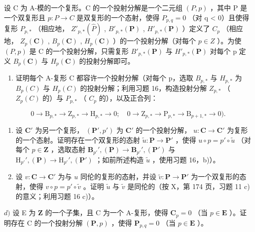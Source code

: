 设 C 为 A-模的一个复形。C 的一个投射分解是一个二元组 \((P, p)\) ，其中 P 是一个双复形且 \(p : P \to C\) 是双复形的一个态射，使得 \(P_{p,q} = 0\) （对 q \textless{} 0）且使得复形 \(P_{p,*}\) （相应地， \(Z'_{p,*}(\hat{P})\) , \(B'_{p,*}(\mathbf{P})\) , \(H'_{p,*}(\mathbf{P})\) ）定义了 \(C_p\) （相应地， \(Z_p(\mathbf{C})\) , \(B_p(\mathbf{C})\) , \(H_p(\mathbf{C})\) ）的一个投射分解（对每个 \(p \in Z\) ）。为使 \((P, p)\) 是 C 的一个投射分解，只需复形 \(B'_{p,*}(\mathbf{P})\) 与 \(H'_{p,*}(\mathbf{P})\) 对每个 p 定义 \(B_p(\mathbf{C})\) 与 \(H_p(\mathbf{C})\) 的投射分解即可。

\begin{enumerate}
\def\labelenumi{\alph{enumi})}
\tightlist
\item
  证明每个 A-复形 C 都容许一个投射分解（对每个 p，选取 \(B_{p,*}\) 与 \(H_{p,*}\) 为 \(B_{p}(C)\) 与 \(H_{p}(C)\) 的投射分解；利用习题 16，构造投射分解 \(Z_{p,*}\) （ \(Z_{p}(C)\) 的）与 \(P_{p,*}\) （ \(C_{p}\) 的），以及正合列：
\end{enumerate}

\[
0 \rightarrow \mathrm{B} _ {p, *} \rightarrow \mathrm{Z} _ {p, *} \rightarrow \mathrm{H} _ {p, *} \rightarrow 0; \quad 0 \rightarrow \mathrm{Z} _ {p, *} \rightarrow \mathrm{P} _ {p, *} \rightarrow \mathrm{B} _ {p + 1, *} \rightarrow 0).
\]

\begin{enumerate}
\def\labelenumi{\alph{enumi})}
\setcounter{enumi}{1}
\item
  设 \(\mathbf{C}'\) 为另一个复形， \((\mathbf{P}', p')\) 为 \(\mathbf{C}'\) 的一个投射分解， \(u: \mathbf{C} \to \mathbf{C}'\) 为复形的一个态射。证明存在一个双复形的态射 \(\tilde{u}: \mathbf{P} \to \mathbf{P}'\) ，使得 \(u \circ p = p' \circ \tilde{u}\) （对每个 \(p \in \mathbf{Z}\) ，选取态射 \(\mathbf{B}_{p'}', (\mathbf{P}) \to \mathbf{B}_{p'}', (\mathbf{P}')\) 与 \(\mathrm{H}_{p'}', (\mathbf{P}) \to \mathrm{H}_{p'}', (\mathbf{P}')\) ；如前所述构造 \(\tilde{u}\) ，使用习题 16，b)）。
\item
  设 \(v: \mathbf{C} \to \mathbf{C}'\) 为与 \(u\) 同伦的复形的态射，并设 \(\tilde{v}: \mathbf{P} \to \mathbf{P}'\) 为一个双复形的态射，使得 \(v \circ p = p' \circ \tilde{v}\) 。证明 \(\tilde{u}\) 与 \(\tilde{v}\) 是同伦的（按 X，第 174 页，习题 11 c) 的意义；利用习题 16 c)）。
\end{enumerate}

\(d)\) 设 E 为 \(\mathbf{Z}\) 的一个子集，且 C 为一个 A-复形，使得 \(\mathbf{C}_{p}=0\) （当 \(p\in\mathbf{E}\) ）。证明存在 C 的一个投射分解 \((\mathbf{P},p)\) ，使得 \(\mathbf{P}_{p,q}=0\) （当 \(p\in\mathbf{E}\) ）。

